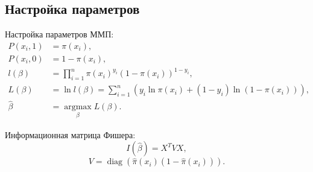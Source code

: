 \documentclass[9pt,pdf,utf8,hyperref={unicode},aspectratio=169]{beamer}
\DeclareMathOperator{\diag}{diag}
\def\argmax#1{ \mathop{\text{argmax}}\limits_{#1} }
\begin{document}
\subsection{Настройка параметров}
\begin{frame}{Настройка параметров}
    ММП:
%    
%
%
    \begin{align*}
    P\left(x_i,1\right) &= \pi\left(x_i\right), \\
    P\left(x_i,0\right) &= 1-\pi\left(x_i\right), \\
    l\left(\beta\right) &= \prod\limits_{i=1}^n \pi\left(x_i\right)^{y_i} \left(1-\pi\left(x_i\right)\right)^{1-y_i}, \\
    L\left(\beta\right) &= \ln l\left(\beta\right) = \sum\limits_{i=1}^n \left(y_i \ln \pi\left(x_i\right) + \left(1-y_i\right) \ln \left(1-\pi\left(x_i\right)\right)\right), \\
    \hat{\beta}         &= \argmax{\beta} L\left(\beta\right).
    \end{align*}
    
    \bigskip
    
    Информационная матрица Фишера:
    $$I\left(\hat{\beta}\right) = X^T V X, $$
    $$V=\diag\left(\hat{\pi}\left(x_i\right)\left(1-\hat{\pi}\left(x_i\right)\right)\right).$$
\end{frame}
\end{document}
